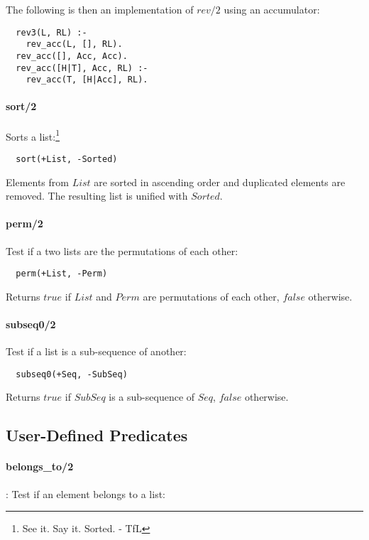 \documentclass{article}
\begin{document}
\begin{multicols}{2}
  The following is then an implementation of $rev/2$ using an accumulator:
  
  \begin{lstlisting}
  rev3(L, RL) :-
    rev_acc(L, [], RL).
  rev_acc([], Acc, Acc).
  rev_acc([H|T], Acc, RL) :-
    rev_acc(T, [H|Acc], RL).
  \end{lstlisting}
  
  \paragraph{sort/2} Sorts a list:\footnote{See it. Say it. Sorted. - TfL}
  
  \begin{lstlisting}
  sort(+List, -Sorted)
  \end{lstlisting} 
  
  Elements from $List$ are sorted in ascending order and duplicated elements are removed. The resulting list is unified with $Sorted$.
  
  \paragraph{perm/2} Test if a two lists are the permutations of each other:
  
  \begin{lstlisting}
  perm(+List, -Perm)
  \end{lstlisting} 
  
  Returns $true$ if $List$ and $Perm$ are permutations of each other, $false$ otherwise.
  
  \paragraph{subseq0/2} Test if a list is a sub-sequence of another:
  
  \begin{lstlisting}
  subseq0(+Seq, -SubSeq)
  \end{lstlisting} 
  
  Returns $true$ if $SubSeq$ is a sub-sequence of $Seq$, $false$ otherwise.
  
  \subsection{User-Defined Predicates}

  \paragraph{belongs\_to/2}: Test if an element belongs to a list:
  

\end{multicols}
\end{document}
